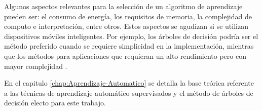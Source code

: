 Algunos aspectos relevantes para la selección de un algoritmo de aprendizaje
pueden ser: el consumo de energía, los requisitos de memoria, la complejidad
de computo e interpretación, entre otros. Estos aspectos se agudizan
si se utilizan dispositivos móviles inteligentes. Por ejemplo, los
árboles de decisión podría ser el método preferido cuando se requiere
simplicidad en la implementación, mientras que los métodos 
para aplicaciones que requieran un alto rendimiento pero con mayor
complejidad \cite{ReyesOrtiz2015}.

En el capitulo \ref{chap:Aprendizaje-Automatico} se detalla la base
teórica referente a las técnicas de aprendizaje automático supervisados
y el método de árboles de decisión electo para este trabajo.
